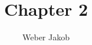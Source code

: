 \documentclass[10pt,a4paper]{report}
\title{Chapter 2}
\author{Weber Jakob}
\begin{document}
\maketitle
\tableofcontents

\end{document}

